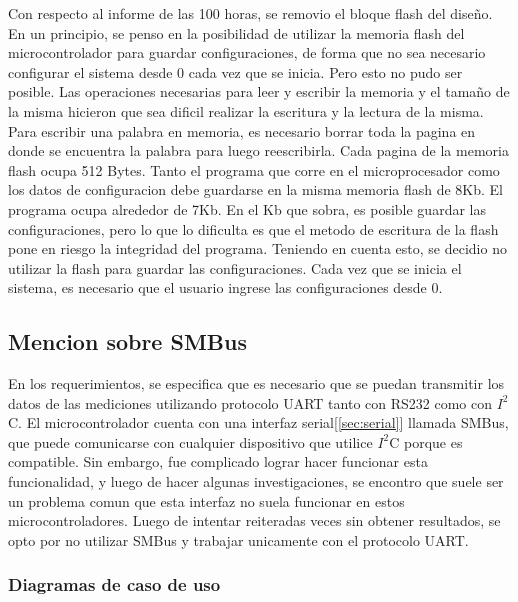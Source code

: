 Con respecto al informe de las 100 horas, se removio el bloque flash del diseño. En un principio, se penso en la posibilidad de utilizar la memoria flash del microcontrolador para guardar configuraciones, de forma que no sea necesario configurar el sistema desde 0 cada vez que se inicia. Pero esto no pudo ser posible. Las operaciones necesarias para leer y escribir la memoria y el tamaño de la misma hicieron que sea dificil realizar la escritura y la lectura de la misma. Para escribir una palabra en memoria, es necesario borrar toda la pagina en donde se encuentra la palabra para luego reescribirla. Cada pagina de la memoria flash ocupa 512 Bytes.
Tanto el programa que corre en el microprocesador como los datos de configuracion debe guardarse en la misma memoria flash de 8Kb. El programa ocupa alrededor de 7Kb. En el Kb que sobra, es posible guardar las configuraciones, pero lo que lo dificulta es que el metodo de escritura de la flash pone en riesgo la integridad del programa. Teniendo en cuenta esto, se decidio no utilizar la flash para guardar las configuraciones. Cada vez que se inicia el sistema, es necesario que el usuario ingrese las configuraciones desde 0.


\subsection{Mencion sobre SMBus} %
\label{sub:mencion_sobre_smbus}

En los requerimientos, se especifica que es necesario que se puedan transmitir los datos de las mediciones utilizando protocolo UART tanto con RS232 como con $I^{2}$C. El microcontrolador cuenta con una interfaz serial[\ref{sec:serial}] llamada SMBus, que puede comunicarse con cualquier dispositivo que utilice $I^{2}$C porque es compatible. Sin embargo, fue complicado lograr hacer funcionar esta funcionalidad, y luego de hacer algunas investigaciones, se encontro que suele ser un problema comun que esta interfaz no suela funcionar en estos microcontroladores. Luego de intentar reiteradas veces sin obtener resultados, se opto por no utilizar SMBus y trabajar unicamente con el protocolo UART.



\subsubsection{Diagramas de caso de uso} %
\label{ssub:diagramas_de_caso_de_uso}

